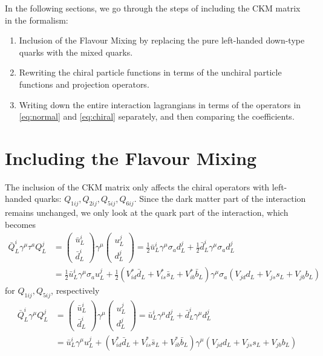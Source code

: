 In the following sections, we go through the steps of including the CKM matrix in the formalism:
\begin{enumerate}
	\item Inclusion of the Flavour Mixing by replacing the pure left-handed down-type quarks with the mixed quarks.
	\item Rewriting the chiral particle functions in terms of the unchiral particle functions and projection operators.
	\item Writing down the entire interaction lagrangians in terms of the operators in \eqref{eq:normal} and \eqref{eq:chiral} separately, and then comparing the coefficients.
\end{enumerate}

\section{Including the Flavour Mixing}
The inclusion of the CKM matrix only affects the chiral operators with left-handed quarks: $Q_{1ij},Q_{2ij},Q_{5ij},Q_{6ij}$. Since the dark matter part of the interaction remains unchanged, we only look at the quark part of the interaction, which becomes
\begin{align*}
	\bar{Q}_L^i\gamma^\mu\tau^a Q_L^j &=  \begin{pmatrix}
	\bar{u}_L^i \\ \bar{d}_L^i
	\end{pmatrix}
	\gamma^\mu \begin{pmatrix}
	u_L^j \\ d_L^j
	\end{pmatrix}
	= \frac{1}{2}\bar{u}_L^i\gamma^\mu \sigma_a d_L^j + \frac{1}{2}\bar{d}_L^i\gamma^\mu\sigma_a d_L^j \\
	&= \frac{1}{2}\bar{u}_L^i\gamma^\mu \sigma_a u_L^j + \frac{1}{2}(V_{id}^*\bar{d}_L + V_{is}^*\bar{s}_L+V_{ib}^*\bar{b}_L)\gamma^\mu\sigma_a(V_{jd}d_L+V_{js}s_L+V_{jb}b_L)
\end{align*}
for $Q_{1ij}, Q_{5ij}$, respectively
\begin{align*}
	\bar{Q}_L^i\gamma^\mu Q_L^j &= \begin{pmatrix}
	\bar{u}_L^i \\ \bar{d}_L^i
	\end{pmatrix}
	\gamma^\mu \begin{pmatrix}
	u_L^j \\ d_L^j
	\end{pmatrix}
	= \bar{u}_L^i\gamma^\mu d_L^j + \bar{d}_L^i\gamma^\mu d_L^j \\
	&= \bar{u}_L^i\gamma^\mu u_L^j + (V_{id}^*\bar{d}_L + V_{is}^*\bar{s}_L+V_{ib}^*\bar{b}_L)\gamma^\mu(V_{jd}d_L+V_{js}s_L+V_{jb}b_L)
\end{align*}
